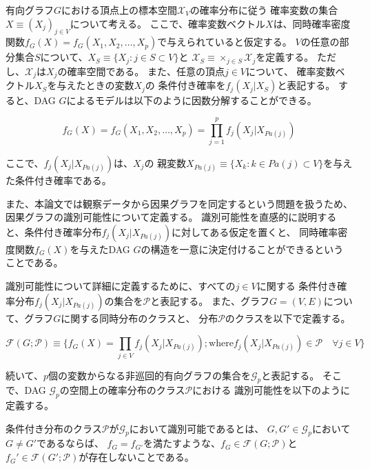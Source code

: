 有向グラフ$G$における頂点上の標本空間$\mathcal X_V$の確率分布に従う
確率変数の集合$X \equiv (X_j)_{j \in V}$について考える。
ここで、確率変数ベクトル$X$は、同時確率密度関数$f_G(X)=f_G(X_1, X_2, \dots, X_p)$で与えられていると仮定する。
$V$の任意の部分集合$S$について、$X_S \equiv \{X_j:j\in S \subset V \}$と
$\mathcal X_S \equiv \times_{j \in S} \mathcal X_j$を定義する。
ただし、$\mathcal X_j$は$X_j$の確率空間である。
また、任意の頂点$j\in V$について、
確率変数ベクトル$X_S$を与えたときの変数$X_j$の
条件付き確率を$f_j(X_j|X_S)$と表記する。
すると、DAG $G$によるモデルは以下のように因数分解することができる\cite{Pearl2009-oh}。

\begin{equation}
  f_G(X)=f_G(X_1, X_2, \dots, X_p) = \prod_{j=1}^p f_j(X_j | X_{Pa(j)})
  \label{eq:factorization}
\end{equation}

ここで、$f_j(X_j | X_{Pa(j)})$は、$X_j$の
親変数$X_{Pa(j)} \equiv \{ X_k:k\in Pa(j) \subset V \}$を与えた条件付き確率である。

また、本論文では観察データから因果グラフを同定するという問題を扱うため、
因果グラフの識別可能性について定義する。
識別可能性を直感的に説明すると、条件付き確率分布$f_j(X_j|X_{Pa(j)})$に対してある仮定を置くと、
同時確率密度関数$f_G(X)$を与えたDAG $G$の構造を一意に決定付けることができるということである。

識別可能性について詳細に定義するために、すべての$j \in V$に関する
条件付き確率分布$f_j(X_j|X_{Pa(j)})$の集合を$\mathcal P$と表記する。
また、グラフ$G=(V,E)$について、グラフ$G$に関する同時分布のクラスと、
分布$\mathcal P$のクラスを以下で定義する。

\begin{equation}
  \mathcal F(G;\mathcal P) \equiv \{ f_G(X) = \prod_{j \in V} f_j(X_j|X_{Pa(j)}) ;
  \text{where} f_j(X_j|X_{Pa(j)}) \in \mathcal P \quad \forall j \in V \}
\end{equation}

続いて、$p$個の変数からなる非巡回的有向グラフの集合を$\mathcal G_p$と表記する。
そこで、DAG $\mathcal G_p$の空間上の確率分布のクラス$\mathcal P$における
識別可能性を以下のように定義する。

\begin{df}[識別可能性]
  条件付き分布のクラス$\mathcal P$が$\mathcal G_p$において識別可能であるとは、
  $G,G' \in \mathcal G_p$において$G \neq G'$であるならば、
  $f_G = f_{G'}$を満たすような、$f_G \in \mathcal F(G; \mathcal P)$と
  $f_G' \in \mathcal F(G'; \mathcal P)$が存在しないことである。
\end{df}
